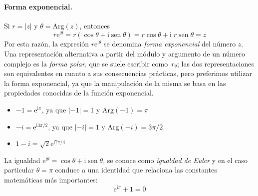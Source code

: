 \paragraph{Forma exponencial.}
Si $r=|z|$ y $\theta=\mathrm{Arg}(z)$, entonces 
\[
r\mathrm{e}^{\mathrm{i}\theta}=
r(\cos \theta + \mathrm{i} \operatorname{sen} \theta)=
r\cos \theta + \mathrm{i}\; r \operatorname{sen} \theta = z
\]
Por esta razón, la expresión $r\mathrm{e}^{\mathrm{i}\theta}$ se denomina \emph{forma exponencial} del número $z$.
Una representación alternativa a partir del módulo y argumento de un número complejo es la \emph{forma polar}, que se suele escribir como~$r_\theta$;
las dos representaciones son equivalentes en cuanto a sus consecuencias prácticas, pero preferimos utilizar la forma exponencial, ya que la manipulación de la misma se basa en las propiedades conocidas de la función exponencial.
%
\begin{ejemplo-br}
\begin{itemize}
\item
$-1 = \mathrm{e}^{\mathrm{i} \pi}$, ya que $|-1|=1$ y $\mathrm{Arg}(-1)=\pi$
\item
$-i = \mathrm{e}^{\mathrm{i}3\pi/2}$, ya que $|-i|=1$ y $\mathrm{Arg}(-i)=3\pi/2$
\item
$1-i =\sqrt2\mathrm{e}^{\mathrm{i}7\pi/4}$\fej
\end{itemize}
\end{ejemplo-br}

La igualdad $\mathrm{e}^{\mathrm{i}\theta} = \cos \theta + \mathrm{i} \operatorname{sen} \theta$, se conoce como \emph{igualdad de Euler} y en el caso particular $\theta=\pi$ conduce a una identidad que relaciona las constantes matemáticas más importantes:
\[
\mathrm{e}^{\mathrm{i}\pi}+1=0
\]

